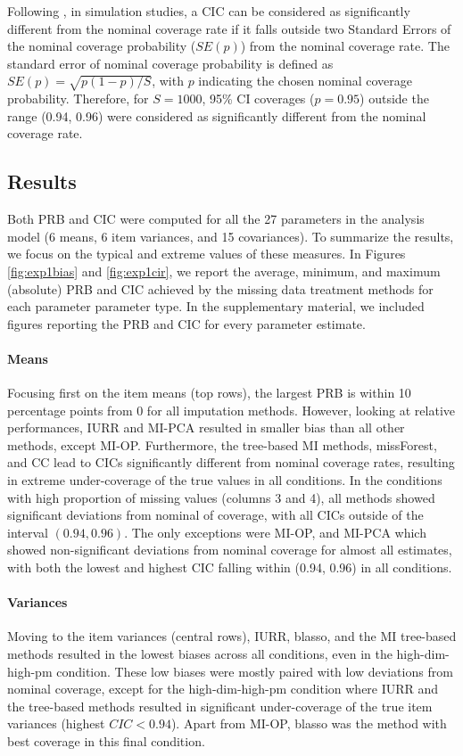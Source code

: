 	Following \cite{burtonEtAl:2006}, in simulation studies, a CIC can be considered as significantly different from the 
	nominal coverage rate if it falls outside two Standard Errors of the nominal coverage probability ($SE(p)$) from the 
	nominal coverage rate.
	The standard error of nominal coverage probability is defined as $SE(p) = \sqrt{p (1-p)/S}$, with $p$ indicating the
	chosen nominal coverage probability.
	Therefore, for $S = 1000$, 95\% CI coverages ($p = 0.95$) outside the range (0.94, 0.96) were considered as significantly 
	different from the nominal coverage rate.

\subsection{Results}
	
	Both PRB and CIC were computed for all the 27 parameters in the analysis model (6 means, 6 item variances,
	and 15 covariances).
	To summarize the results, we focus on the typical and extreme values of these measures.
	In Figures \ref{fig:exp1bias} and \ref{fig:exp1cir}, we report the average, minimum, and maximum (absolute) PRB 
	and CIC achieved by the missing data treatment methods for each parameter parameter type.
	In the supplementary material, we included figures reporting the PRB and CIC for every parameter estimate.

	\paragraph{Means} 
	Focusing first on the item means (top rows), the largest PRB is within 10 percentage points from 0 for all 
	imputation methods.
	However, looking at relative performances, IURR and MI-PCA resulted in smaller bias than all other methods, 
	except MI-OP.
	Furthermore, the tree-based MI methods, missForest, and CC lead to CICs significantly different from nominal 
	coverage rates, resulting in extreme under-coverage of the true values in all conditions.
	In the conditions with high proportion of missing values (columns 3 and 4), all methods showed significant deviations 
	from nominal of coverage, with all CICs outside of the interval $(0.94, 0.96)$.
	The only exceptions were MI-OP, and MI-PCA which showed non-significant deviations from nominal coverage for 
	almost all estimates, with both the lowest and highest CIC falling within (0.94, 0.96) in all conditions.

	\paragraph{Variances} 
	Moving to the item variances (central rows), IURR, blasso, and the MI tree-based methods resulted in the lowest
	biases across all conditions, even in the high-dim-high-pm condition.
	These low biases were mostly paired with low deviations from nominal coverage, except for the high-dim-high-pm
	condition where IURR and the tree-based methods resulted in significant under-coverage of the true item 
	variances (highest $CIC < 0.94$).
	Apart from MI-OP, blasso was the method with best coverage in this final condition.
	
